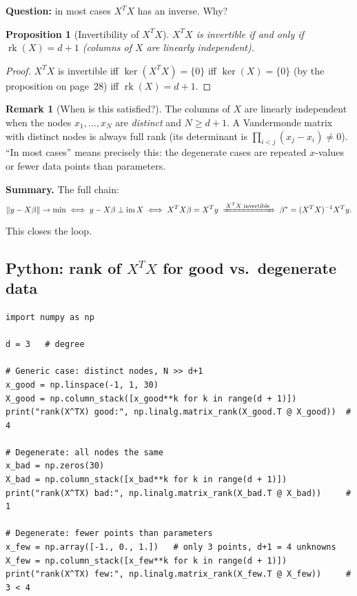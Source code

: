 \documentclass[11pt]{article}
\theoremstyle{definition}
\newtheorem{remark}{Remark}[section]
\theoremstyle{plain}
\newtheorem{proposition}{Proposition}[section]
\begin{document}
\medskip\noindent
\textbf{Question:} in most cases $X^TX$ has an inverse.  Why?

\begin{proposition}[Invertibility of $X^TX$]
  $X^TX$ is invertible if and only if $\operatorname{rk}(X) = d+1$
  (columns of $X$ are linearly independent).
\end{proposition}
\begin{proof}
  $X^TX$ is invertible iff $\ker(X^TX) = \{0\}$ iff $\ker(X) = \{0\}$
  (by the proposition on page~28) iff $\operatorname{rk}(X) = d+1$.
\end{proof}

\begin{remark}[When is this satisfied?]
  The columns of $X$ are linearly independent when the nodes $x_1,\ldots,x_N$
  are \emph{distinct} and $N \geq d+1$.  A Vandermonde matrix with distinct
  nodes is always full rank (its determinant is $\prod_{i<j}(x_j-x_i)\neq 0$).
  ``In most cases'' means precisely this: the degenerate cases are repeated
  $x$-values or fewer data points than parameters.
\end{remark}

\noindent
\textbf{Summary.}  The full chain:
\[
  \|y - X\beta\| \to \min
  \;\Longleftrightarrow\;
  y - X\beta \perp \operatorname{im}X
  \;\Longleftrightarrow\;
  X^TX\beta = X^Ty
  \;\xRightarrow{\,X^TX \text{ invertible}\,}\;
  \beta^* = (X^TX)^{-1}X^Ty.
\]
This closes the loop.

\subsection{Python: rank of $X^TX$ for good vs.\ degenerate data}
\begin{lstlisting}
import numpy as np

d = 3   # degree

# Generic case: distinct nodes, N >> d+1
x_good = np.linspace(-1, 1, 30)
X_good = np.column_stack([x_good**k for k in range(d + 1)])
print("rank(X^TX) good:", np.linalg.matrix_rank(X_good.T @ X_good))  # 4

# Degenerate: all nodes the same
x_bad = np.zeros(30)
X_bad = np.column_stack([x_bad**k for k in range(d + 1)])
print("rank(X^TX) bad:", np.linalg.matrix_rank(X_bad.T @ X_bad))     # 1

# Degenerate: fewer points than parameters
x_few = np.array([-1., 0., 1.])   # only 3 points, d+1 = 4 unknowns
X_few = np.column_stack([x_few**k for k in range(d + 1)])
print("rank(X^TX) few:", np.linalg.matrix_rank(X_few.T @ X_few))     # 3 < 4
\end{lstlisting}
\end{document}

